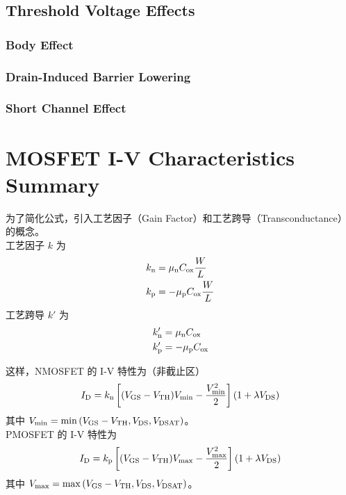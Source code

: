 \subsection{Threshold Voltage Effects}
\subsubsection{Body Effect}

\subsubsection{Drain-Induced Barrier Lowering}

\subsubsection{Short Channel Effect}

\section{MOSFET I-V Characteristics Summary}

为了简化公式，引入工艺因子（Gain Factor）和工艺跨导（Transconductance）的概念。\\
工艺因子 $k$ 为
\begin{equation}
    \begin{aligned}
        k_{\rm{n}} &= \mu_{\rm{n}} C_{\rm{ox}} \frac{W}{L} \\
        k_{\rm{p}} &= -\mu_{\rm{p}} C_{\rm{ox}} \frac{W}{L}
    \end{aligned}
\end{equation}
工艺跨导 $k'$ 为
\begin{equation}
    \begin{aligned}
        k'_{\rm{n}} &= \mu_{\rm{n}} C_{\rm{ox}} \\
        k'_{\rm{p}} &= -\mu_{\rm{p}} C_{\rm{ox}}
    \end{aligned}
\end{equation}

这样，NMOSFET 的 I-V 特性为（非截止区）
\begin{equation}
    I_{\rm{D}} = k_{\rm{n}} \left[ (V_{\rm{GS}} - V_{\rm{TH}}) V_{\rm{min}} - \frac{V_{\rm{min}}^2}{2} \right] \left(1 + \lambda V_{\rm{DS}}\right)
\end{equation}
其中 $V_{\rm{min}} = \min \left(V_{\rm{GS}} - V_{\rm{TH}}, V_{\rm{DS}}, V_{\rm{DSAT}}\right)$。\\
PMOSFET 的 I-V 特性为
\begin{equation}
    I_{\rm{D}} = k_{\rm{p}} \left[ (V_{\rm{GS}} - V_{\rm{TH}}) V_{\rm{max}} - \frac{V_{\rm{max}}^2}{2} \right] \left(1 + \lambda V_{\rm{DS}}\right)
\end{equation}
其中 $V_{\rm{max}} = \max \left(V_{\rm{GS}} - V_{\rm{TH}}, V_{\rm{DS}}, V_{\rm{DSAT}}\right)$。

